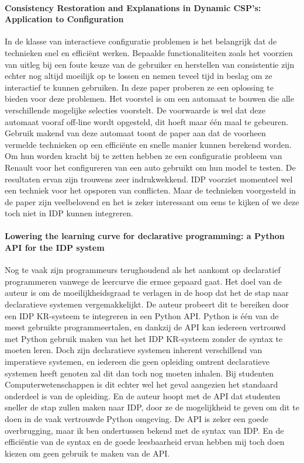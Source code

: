 \paragraph{Consistency Restoration and Explanations in Dynamic CSP's: Application to Configuration \cite{amilhastre01}}
In de klasse van interactieve configuratie problemen is het belangrijk dat de technieken snel en effici\"{e}nt werken. Bepaalde functionaliteiten zoals het voorzien van uitleg bij een foute keuze van de gebruiker en herstellen van consistentie zijn echter nog altijd moeilijk op te lossen en nemen teveel tijd in beslag om ze interactief te kunnen gebruiken. In deze paper proberen ze een oplossing te bieden voor deze problemen. Het voorstel is om een automaat te bouwen die alle verschillende mogelijke selecties voorstelt. De voorwaarde is wel dat deze automaat vooraf off-line wordt opgesteld, dit hoeft maar \'{e}\'{e}n maal te gebeuren. Gebruik makend van deze automaat toont de paper aan dat de voorheen vermelde technieken op een effici\"{e}nte en snelle manier kunnen berekend worden. Om hun worden kracht bij te zetten hebben ze een configuratie probleem van Renault voor het configureren van een auto gebruikt om hun model te testen. De resultaten ervan zijn trouwens zeer indrukwekkend. IDP voorziet momenteel wel een techniek voor het opsporen van conflicten. Maar de technieken voorgesteld in de paper zijn veelbelovend en het is zeker interessant om eens te kijken of we deze toch niet in IDP kunnen integreren. 

\paragraph{Lowering the learning curve for declarative programming: a Python API for the IDP system \cite{vennekens15}}
Nog te vaak zijn programmeurs terughoudend als het aankomt op declaratief programmeren vanwege de leercurve die ermee gepaard gaat. Het doel van de auteur is om de moeilijkheidsgraad te verlagen in de hoop dat het de stap naar declaratieve systemen vergemakkelijkt. De auteur probeert dit te bereiken door een IDP KR-systeem te integreren in een Python API. Python is \'{e}\'{e}n van de meest gebruikte programmeertalen, en dankzij de API kan iedereen vertrouwd met Python gebruik maken van het het IDP KR-systeem zonder de syntax te moeten leren. 
Doch zijn declaratieve systemen inherent verschillend van imperatieve systemen, en iedereen die geen opleiding omtrent declaratieve systemen heeft genoten zal dit dan toch nog moeten inhalen. Bij studenten Computerwetenschappen is dit echter wel het geval aangezien het standaard onderdeel is van de opleiding. En de auteur hoopt met de API dat studenten sneller de stap zullen maken naar IDP, door ze de mogelijkheid te geven om dit te doen in de vaak vertrouwde Python omgeving.
De API is zeker een goede overbrugging, maar ik ben ondertussen bekend met de syntax van IDP. En de effici\"{e}ntie van de syntax en de goede leesbaarheid ervan hebben mij toch doen kiezen om geen gebruik te maken van de API. 

